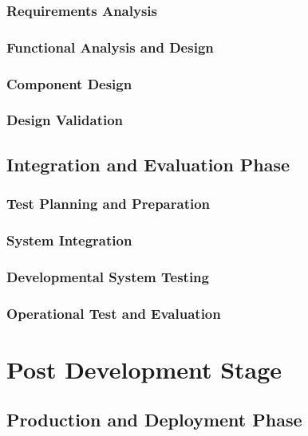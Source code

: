 \documentclass[a4paper,11pt,fleqn]{report}
\begin{document}
\subsection{Requirements Analysis}

\subsection{Functional Analysis and Design}

\subsection{Component Design}

\subsection{Design Validation}

\section{Integration and Evaluation Phase}

\subsection{Test Planning and Preparation}

\subsection{System Integration}

\subsection{Developmental System Testing}

\subsection{Operational Test and Evaluation}

\chapter{Post Development Stage}

\section{Production and Deployment Phase}
\end{document}
